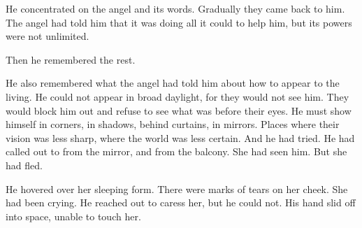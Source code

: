 
He concentrated on the angel and its words. 
Gradually they came back to him. 
The angel had told him that it was doing all it could to help him, but its powers were not unlimited. 


Then he remembered the rest. 

He also remembered what the angel had told him about how to appear to the living. 
He could not appear in broad daylight, for they would not see him. 
They would block him out and refuse to see what was before their eyes. 
He must show himself in corners, in shadows, behind curtains, in mirrors. 
Places where their vision was less sharp, where the world was less certain. 
And he had tried. 
He had called out to \Tiroco{} from the mirror, and from the balcony. 
She had seen him. 
But she had fled. 





% 
% 
% 
  
He hovered over her sleeping form. 
There were marks of tears on her cheek. 
She had been crying. 
He reached out to caress her, but he could not. 
His hand slid off into space, unable to touch her. 

